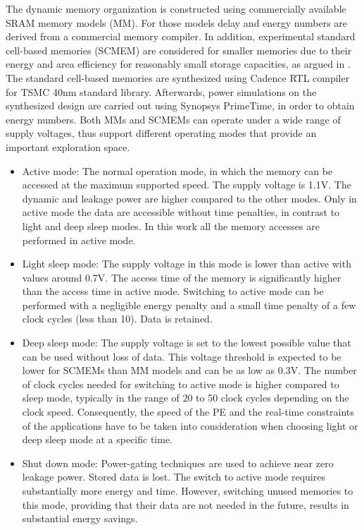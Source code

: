 \documentclass[prodmode,acmtecs]{acmsmall}
\begin{document}
The dynamic memory organization is constructed using commercially available SRAM memory models (MM).
For those models delay and energy numbers are derived from a commercial memory compiler.
In addition, experimental standard cell-based memories (SCMEM) \cite{Mei11}  are  considered for smaller memories due to their energy and area efficiency for reasonably small storage capacities, as argued in \cite{Mei10}. 
The standard cell-based memories are synthesized using Cadence RTL compiler for TSMC 40nm standard library. 
Afterwards, power simulations on the synthesized design are carried out using Synopsys PrimeTime, in order to obtain energy numbers.
Both MMs and SCMEMs can operate under a wide range of supply voltages, thus support different operating modes that provide an important exploration space.
\begin{itemize}
\item Active mode: The normal operation mode, in which the memory can be accessed at the maximum supported speed. The supply voltage is 1.1V. 
The dynamic and leakage power are higher compared to the other modes.
Only in active mode the data are accessible without time penalties, in contrast to light and deep sleep modes.
In this work all the memory accesses are performed in active mode. 
\item Light sleep mode: The supply voltage in this mode is lower than active with values around 0.7V. 
The access time of the memory is significantly higher than the access time in active mode. 
Switching to active mode can be performed with a negligible energy penalty and a small time penalty of a few clock cycles (less than 10). 
Data is retained.  
\item Deep sleep mode: The supply voltage is set to the lowest possible value that can be used without loss of data. 
This voltage threshold is expected to be lower for SCMEMs than MM models and can be as low as 0.3V. 
The number of clock cycles needed for switching to active mode is higher compared to sleep mode, typically in the range of 20 to 50 clock cycles depending on the clock speed. 
Consequently, the speed of the PE and the real-time constraints of the applications have to be taken into consideration when choosing light or deep sleep mode at a specific time.  
\item Shut down mode: Power-gating techniques are used to achieve near zero leakage power. 
Stored data is lost. 
The switch to active mode requires substantially more energy and time. 
However, switching unused memories to this mode, providing that their data are not needed in the future, results in substantial energy savings.
\end{itemize}  
\end{document}
